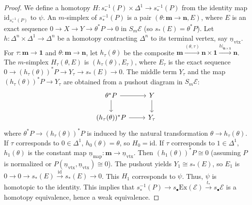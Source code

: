 \documentclass[12pt]{report}
\numberwithin{equation}{section}
\begin{document}
\begin{proof}
		We define a homotopy $H : s_*^{-1}(P) \times \Delta^1 \to s_*^{-1}(P)$ from the identity map $\mathrm{id}_{s_*^{-1}(P)}$ to $\psi$.
		An $m$-simplex of $s_*^{-1}(P)$ is a pair $(\theta: \mathbf{m} \to \mathbf{n}, E)$, where $E$ is an exact sequence $0 \to X \to Y \to \theta^*P \to 0$ in $S_m\mathcal{E}$ (so $s_*(E) = \theta^*P$).
		Let $h: \Delta^n \times \Delta^1 \to \Delta^n$ be a homotopy contracting $\Delta^n$ to its terminal vertex, say $\underline{n}_{\text{vtx}}$.
		For $\tau: \mathbf{m} \to \mathbf{1}$ and $\theta: \mathbf{m} \to \mathbf{n}$, let $h_\tau(\theta)$ be the composite $\mathbf{m} \xrightarrow{(\theta,\tau)} \mathbf{n} \times \mathbf{1} \xrightarrow{h|_{\mathbf{n} \times \mathbf{1}}} \mathbf{n}$.
		The $m$-simplex $H_\tau(\theta, E)$ is $(h_\tau(\theta), E_\tau)$, where $E_\tau$ is the exact sequence $0 \to (h_\tau(\theta))^*P \to Y_\tau \to s_*(E) \to 0$.
		The middle term $Y_\tau$ and the map $(h_\tau(\theta))^*P \to Y_\tau$ are obtained from a pushout diagram in $S_m\mathcal{E}$:
		\[
		\begin{tikzcd}
			\theta^*P \arrow[r] \arrow[d] & Y \arrow[d] \\
			(h_\tau(\theta))^*P \arrow[r] & Y_\tau
		\end{tikzcd}
		\]
		where $\theta^*P \to (h_\tau(\theta))^*P$ is induced by the natural transformation $\theta \to h_\tau(\theta)$.
		If $\tau$ corresponds to $0 \in \Delta^1$, $h_0(\theta) = \theta$, so $H_0 = \mathrm{id}$.
		If $\tau$ corresponds to $1 \in \Delta^1$, $h_1(\theta)$ is the constant map $\underline{n}_{\text{map}}: \mathbf{m} \to \underline{n}_{\text{vtx}}$. Then $(h_1(\theta))^*P \cong 0$ (assuming $P$ is normalized or $P(\underline{n}_{\text{vtx}},\underline{n}_{\text{vtx}}) \cong 0$). The pushout yields $Y_1 \cong s_*(E)$, so $E_1$ is $0 \to 0 \to s_*(E) \xrightarrow{\mathrm{id}} s_*(E) \to 0$.
		This $H_1$ corresponds to $\psi$.
		Thus, $\psi$ is homotopic to the identity. This implies that $s_*^{-1}(P) \to s_\bullet\mathrm{Ex}(\mathcal{E}) \xrightarrow{t_*} s_\bullet\mathcal{E}$ is a homotopy equivalence, hence a weak equivalence.
	\end{proof}
	
\end{document}
